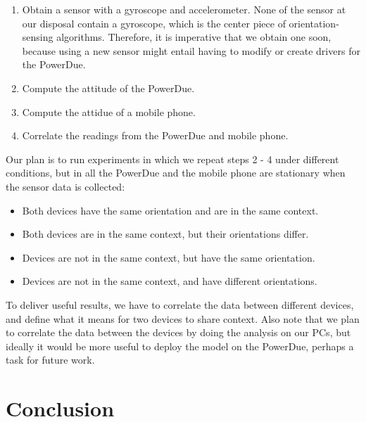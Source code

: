 \documentclass[journal]{IEEEtranTIE}
\begin{document}
\begin{enumerate}
\item Obtain a sensor with a gyroscope and accelerometer. None of the sensor at
      our disposal contain a gyroscope, which is the center piece of
      orientation-sensing algorithms. Therefore, it is imperative that we obtain
      one soon, because using a new sensor might entail having to modify or
      create drivers for the PowerDue.
\item Compute the attitude of the PowerDue.
\item Compute the attidue of a mobile phone.
\item Correlate the readings from the PowerDue and mobile phone.
\end{enumerate}

Our plan is to run experiments in which we repeat steps 2 - 4 under different
conditions, but in all the PowerDue and the mobile phone are stationary when the
sensor data is collected:

\begin{itemize}
\item Both devices have the same orientation and are in the same context.
\item Both devices are in the same context, but their orientations differ.
\item Devices are not in the same context, but have the same orientation.
\item Devices are not in the same context, and have different orientations.
\end{itemize}

To deliver useful results, we have to correlate the data between different
devices, and define what it means for two devices to share context. Also note
that we plan to correlate the data between the devices by doing the
analysis on our PCs, but ideally it would be more useful to deploy the model
on the PowerDue, perhaps a task for future work.

\section{Conclusion}
\end{document}
